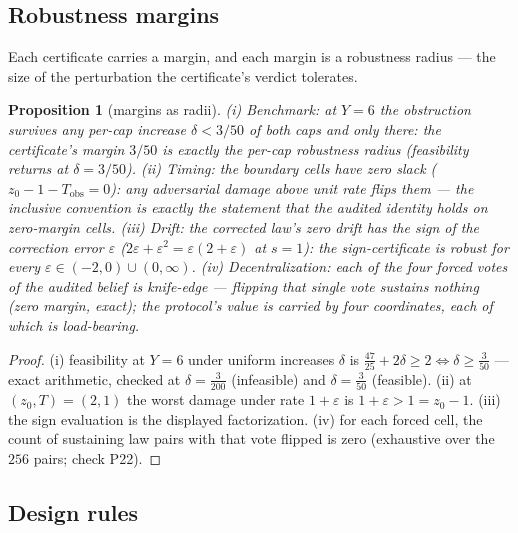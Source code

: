 \documentclass[10pt,twocolumn]{article}
\theoremstyle{plain}
\newtheorem{proposition}[theorem]{Proposition}
\theoremstyle{definition}
\theoremstyle{remark}
\begin{document}
\subsection{Robustness margins}\label{audit-margins}

Each certificate carries a margin, and each margin is a robustness
radius --- the size of the perturbation the certificate's verdict
tolerates.

\begin{proposition}[margins as radii]\label{audit-prop:margins}
(i) \emph{Benchmark}: at \(Y = 6\) the obstruction survives any
per-cap increase \(\delta < 3/50\) of both caps and only there: the
certificate's margin \(3/50\) is exactly the per-cap robustness radius
(feasibility returns at \(\delta = 3/50\)). (ii) \emph{Timing}: the
boundary cells have zero slack (\(z_0 - 1 - T_{\mathrm{obs}} = 0\)):
any adversarial damage above unit rate flips them --- the inclusive
convention is exactly the statement that the audited identity holds on
zero-margin cells. (iii) \emph{Drift}: the corrected law's zero drift
has the sign of the correction error \(\varepsilon\) (\(2\varepsilon +
\varepsilon^2 = \varepsilon(2 + \varepsilon)\) at \(s = 1\)): the
sign-certificate is robust for every \(\varepsilon \in (-2, 0) \cup
(0, \infty)\). (iv) \emph{Decentralization}: each of the four forced
votes of the audited belief is knife-edge --- flipping that single vote
sustains nothing (zero margin, exact); the protocol's value is carried
by four coordinates, each of which is load-bearing.
\end{proposition}

\begin{proof}
(i) feasibility at \(Y = 6\) under uniform increases \(\delta\) is
\(\tfrac{47}{25} + 2\delta \ge 2 \iff \delta \ge
\tfrac{3}{50}\) --- exact arithmetic, checked at \(\delta =
\tfrac{3}{200}\) (infeasible) and \(\delta = \tfrac{3}{50}\)
(feasible). (ii) at \((z_0, T) = (2, 1)\) the worst damage under rate
\(1 + \varepsilon\) is \(1 + \varepsilon > 1 = z_0 - 1\). (iii) the
sign evaluation is the displayed factorization. (iv) for each forced
cell, the count of sustaining law pairs with that vote flipped is zero
(exhaustive over the \(256\) pairs; check P22).
\end{proof}

\subsection{Design rules}\label{audit-rules}
\end{document}
